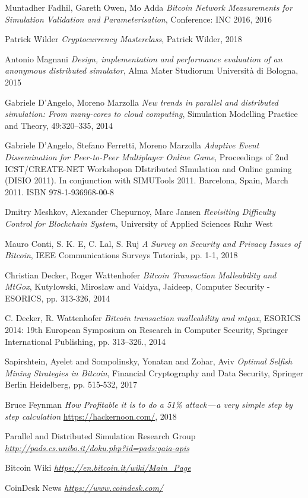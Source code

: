 \begin{thebibliography}{99}
 Muntadher Fadhil, Gareth Owen, Mo Adda
{\em Bitcoin Network Measurements for Simulation Validation and Parameterisation},
Conference: INC 2016, 2016

 Patrick Wilder
{\em Cryptocurrency Masterclass},
Patrick Wilder, 2018

 Antonio Magnani
{\em Design, implementation and performance evaluation of an anonymous distributed simulator},
Alma Mater Studiorum Università di Bologna, 2015

 Gabriele D'Angelo, Moreno Marzolla
{\em New trends in parallel and distributed simulation: From many-cores to cloud computing},
Simulation Modelling Practice and Theory, 49:320–335, 2014

 Gabriele D'Angelo, Stefano Ferretti, Moreno Marzolla
{\em Adaptive Event Dissemination for Peer-to-Peer Multiplayer Online Game},
Proceedings of 2nd ICST/CREATE-NET Workshopon DIstributed SImulation and Online gaming (DISIO 2011).
In conjunction with SIMUTools 2011. Barcelona, Spain, March 2011. ISBN 978-1-936968-00-8

 Dmitry Meshkov, Alexander Chepurnoy, Marc Jansen
{\em Revisiting Difficulty Control for Blockchain System},
University of Applied Sciences Ruhr West

 Mauro Conti, S. K. E, C. Lal, S. Ruj
{\em A Survey on Security and Privacy Issues of Bitcoin}, 
IEEE Communications Surveys Tutorials, pp. 1-1, 2018

 Christian Decker, Roger Wattenhofer
{\em Bitcoin Transaction Malleability and MtGox},
Kuty{\l}owski, Miros{\l}aw and Vaidya, Jaideep, Computer Security - ESORICS, pp. 313-326, 2014

\bibitem C. Decker, R.  Wattenhofer
{\em Bitcoin  transaction  malleability  and mtgox},
ESORICS 2014: 19th European Symposium on Research in Computer Security, Springer International Publishing, pp. 313–326., 2014

 Sapirshtein, Ayelet and Sompolinsky, Yonatan and Zohar, Aviv
{\em Optimal Selfish Mining Strategies in Bitcoin},
Financial Cryptography and Data Security, Springer Berlin Heidelberg, pp. 515-532, 2017

 Bruce Feynman
{\em How Profitable it is to do a 51\% attack — a very simple step by step calculation}
\url{https://hackernoon.com/}, 2018

 Parallel and Distributed Simulation Research Group
{\em \url{http://pads.cs.unibo.it/doku.php?id=pads:gaia-apis}}

 Bitcoin Wiki
{\em \url{https://en.bitcoin.it/wiki/Main_Page}}

 CoinDesk News
{\em \url{https://www.coindesk.com/}}

\end{thebibliography}

